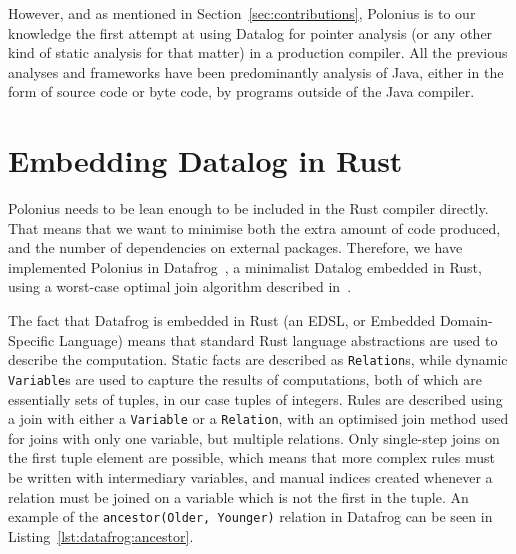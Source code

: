 \documentclass[11pt,a4paper,twoside,openany,draft]{report}
\newcommand{\InRust}[1]{\texttt{#1}}
\newcommand{\InDatalog}[1]{\texttt{#1}}
\begin{document}
However, and as mentioned in Section~\ref{sec:contributions}, Polonius is to our
knowledge the first attempt at using Datalog for pointer analysis (or any other
kind of static analysis for that matter) in a production compiler. All the
previous analyses and frameworks have been predominantly analysis of Java,
either in the form of source code or byte code, by programs outside of the Java
compiler.

\section{Embedding Datalog in Rust}\label{sec:datafrog}

Polonius needs to be lean enough to be included in the Rust compiler directly.
That means that we want to minimise both the extra amount of code produced, and
the number of dependencies on external packages. Therefore, we have implemented
Polonius in Datafrog~\cite{datafrog}, a minimalist Datalog embedded in Rust,
using a worst-case optimal join algorithm described
in~\cite{ngo_worst-case_2012}.

The fact that Datafrog is embedded in Rust (an EDSL, or Embedded Domain-Specific
Language) means that standard Rust language abstractions are used to describe
the computation. Static facts are described as \InRust{Relation}s, while dynamic
\InRust{Variable}s are used to capture the results of computations, both of
which are essentially sets of tuples, in our case tuples of integers. Rules are
described using a join with either a \InRust{Variable} or a \InRust{Relation},
with an optimised join method used for joins with only one variable, but
multiple relations. Only single-step joins on the first tuple element are
possible, which means that more complex rules must be written with intermediary
variables, and manual indices created whenever a relation must be joined on a
variable which is not the first in the tuple. An example of the
\InDatalog{ancestor(Older, Younger)} relation in Datafrog can be seen in
Listing~\ref{lst:datafrog:ancestor}.
\end{document}
